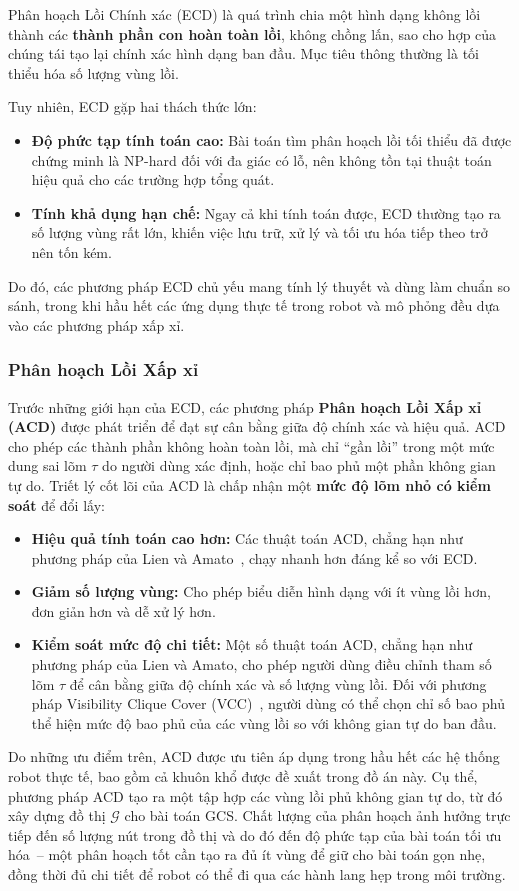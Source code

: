 Phân hoạch Lồi Chính xác (ECD) là quá trình chia một hình dạng không lồi thành các \textbf{thành
phần con hoàn toàn lồi}, không chồng lấn, sao cho hợp của chúng tái tạo lại chính xác hình dạng ban
đầu.
Mục tiêu thông thường là tối thiểu hóa số lượng vùng lồi.

Tuy nhiên, ECD gặp hai thách thức lớn:
\begin{itemize}
    \item \textbf{Độ phức tạp tính toán cao:}
    Bài toán tìm phân hoạch lồi tối thiểu đã được chứng minh là NP-hard đối với đa giác có lỗ,
    nên không tồn tại thuật toán hiệu quả cho các trường hợp tổng quát.
    \item \textbf{Tính khả dụng hạn chế:}
    Ngay cả khi tính toán được, ECD thường tạo ra số lượng vùng rất lớn,
    khiến việc lưu trữ, xử lý và tối ưu hóa tiếp theo trở nên tốn kém.
\end{itemize}
Do đó, các phương pháp ECD chủ yếu mang tính lý thuyết và dùng làm chuẩn so sánh,
trong khi hầu hết các ứng dụng thực tế trong robot và mô phỏng đều dựa vào các phương pháp xấp xỉ.

\subsubsection{Phân hoạch Lồi Xấp xỉ}

Trước những giới hạn của ECD, các phương pháp \textbf{Phân hoạch Lồi Xấp xỉ (ACD)} được phát triển
để đạt sự cân bằng giữa độ chính xác và hiệu quả.
ACD cho phép các thành phần không hoàn toàn lồi, mà chỉ ``gần lồi'' trong một mức dung sai lõm
$\tau$ do người dùng xác định, hoặc chỉ bao phủ một phần không gian tự do.
Triết lý cốt lõi của ACD là chấp nhận một \textbf{mức độ lõm nhỏ có kiểm soát} để đổi lấy:
\begin{itemize}
    \item \textbf{Hiệu quả tính toán cao hơn:}
    Các thuật toán ACD, chẳng hạn như phương pháp của Lien và Amato~\cite{LienAmato2006},
    chạy nhanh hơn đáng kể so với ECD.
    \item \textbf{Giảm số lượng vùng:}
    Cho phép biểu diễn hình dạng với ít vùng lồi hơn, đơn giản hơn và dễ xử lý hơn.
    \item \textbf{Kiểm soát mức độ chi tiết:}
    Một số thuật toán ACD, chẳng hạn như phương pháp của Lien và Amato, cho phép người dùng điều
    chỉnh tham số lõm $\tau$ để cân bằng giữa độ chính xác và số lượng vùng lồi.
    Đối với phương pháp Visibility Clique Cover (VCC)~\cite{DeitsTedrake2023VCC}, người dùng có
    thể chọn chỉ số bao phủ thể hiện mức độ bao phủ của các vùng lồi so với không gian tự do ban đầu.
\end{itemize}

Do những ưu điểm trên, ACD được ưu tiên áp dụng trong hầu hết các hệ thống robot thực tế,
bao gồm cả khuôn khổ được đề xuất trong đồ án này.
Cụ thể, phương pháp ACD tạo ra một tập hợp các vùng lồi phủ không gian tự do, từ đó xây dựng đồ thị
$\mathcal{G}$ cho bài toán GCS.
Chất lượng của phân hoạch ảnh hưởng trực tiếp đến số lượng nút trong đồ thị và do đó đến độ phức
tạp của bài toán tối ưu hóa~-- một phân hoạch tốt cần tạo ra đủ ít vùng để giữ cho bài toán gọn
nhẹ, đồng thời đủ chi tiết để robot có thể đi qua các hành lang hẹp trong môi trường.
